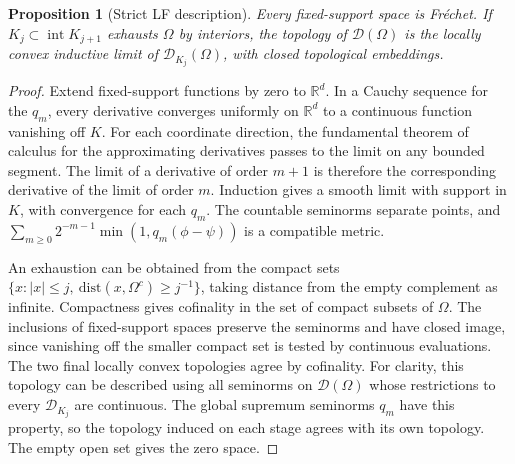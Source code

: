 \documentclass[11pt,oneside,openany]{book}
\newtheorem{proposition}[theorem]{Proposition}
\theoremstyle{definition}
\theoremstyle{remark}
\begin{document}
\begin{proposition}[Strict LF description]
Every fixed-support space is Fr\'echet. If \(K_j\subset\operatorname{int}K_{j+1}\) exhausts \(\Omega\) by interiors, the topology of \(\mathcal D(\Omega)\) is the locally convex inductive limit of \(\mathcal D_{K_j}(\Omega)\), with closed topological embeddings.
\end{proposition}
\begin{proof}
Extend fixed-support functions by zero to \(\mathbb R^d\). In a Cauchy sequence for the \(q_m\), every derivative converges uniformly on \(\mathbb R^d\) to a continuous function vanishing off \(K\). For each coordinate direction, the fundamental theorem of calculus for the approximating derivatives passes to the limit on any bounded segment. The limit of a derivative of order \(m+1\) is therefore the corresponding derivative of the limit of order \(m\). Induction gives a smooth limit with support in \(K\), with convergence for each \(q_m\). The countable seminorms separate points, and \(\sum_{m\geq0}2^{-m-1}\min(1,q_m(\phi-\psi))\) is a compatible metric.

An exhaustion can be obtained from the compact sets \(\{x: |x|\leq j,\ \mathrm{dist}(x,\Omega^c)\geq j^{-1}\}\), taking distance from the empty complement as infinite. Compactness gives cofinality in the set of compact subsets of \(\Omega\). The inclusions of fixed-support spaces preserve the seminorms and have closed image, since vanishing off the smaller compact set is tested by continuous evaluations. The two final locally convex topologies agree by cofinality. For clarity, this topology can be described using all seminorms on \(\mathcal D(\Omega)\) whose restrictions to every \(\mathcal D_{K_j}\) are continuous. The global supremum seminorms \(q_m\) have this property, so the topology induced on each stage agrees with its own topology. The empty open set gives the zero space.
\end{proof}
\end{document}
